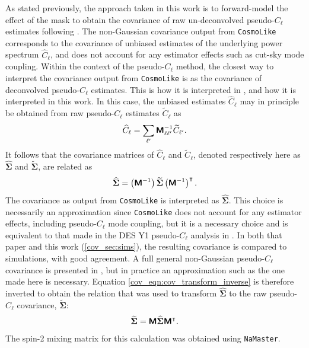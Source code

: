As stated previously, the approach taken in this work is to forward-model the effect of the mask to obtain the covariance of raw un-deconvolved pseudo-$C_\ell$ estimates following \citet{Loureiro2021}.
The non-Gaussian covariance output from \texttt{CosmoLike} corresponds to the covariance of unbiased estimates of the underlying power spectrum $\widehat{C}_\ell$, and does not account for any estimator effects such as cut-sky mode coupling. Within the context of the pseudo-$C_\ell$ method, the closest way to interpret the covariance output from \texttt{CosmoLike} is as the covariance of deconvolved pseudo-$C_\ell$ estimates. This is how it is interpreted in \citet{Camacho2021}, and how it is interpreted in this work. In this case, the unbiased estimates $\widehat{C}_\ell$ may in principle be obtained from raw pseudo-$C_\ell$ estimates $\widetilde{C}_\ell$ as
\begin{equation}
\widehat{C}_\ell = \sum_{\ell'} \bm{\mathsf{M}}^{-1}_{\ell \ell'} \widetilde{C}_{\ell'}.
\end{equation}
It follows that the covariance matrices of $\widehat{C}_\ell$ and $\widetilde{C}_\ell$, denoted respectively here as $\mathbf{\widehat{\Sigma}}$ and $\mathbf{\widetilde{\Sigma}}$, are related as
\begin{equation}
\mathbf{\widehat{\Sigma}} =
\left( \bm{\mathsf{M}}^{-1} \right)
\mathbf{\widetilde{\Sigma}}
\left( \bm{\mathsf{M}}^{-1} \right)^\intercal.
\label{cov_eqn:cov_transform_inverse}
\end{equation}
The covariance as output from \texttt{CosmoLike} is interpreted as $\mathbf{\widehat{\Sigma}}$.
This choice is necessarily an approximation since \texttt{CosmoLike} does not account for any estimator effects, including pseudo-$C_\ell$ mode coupling, but it is a necessary choice and is equivalent to that made in the DES Y1 pseudo-$C_\ell$ analysis in \citet{Camacho2021}. In both that paper and this work (\autoref{cov_sec:sims}), the resulting covariance is compared to simulations, with good agreement. A full general non-Gaussian pseudo-$C_\ell$ covariance is presented in \citet{Shirasaki2015}, but in practice an approximation such as the one made here is necessary.
Equation \eqref{cov_eqn:cov_transform_inverse} is therefore inverted to obtain the relation that was used to transform $\mathbf{\widehat{\Sigma}}$ to the raw pseudo-$C_\ell$ covariance, $\mathbf{\widetilde{\Sigma}}$:
\begin{equation}
\mathbf{\widetilde{\Sigma}} =
\bm{\mathsf{M}} \mathbf{\widehat{\Sigma}} \bm{\mathsf{M}}^\intercal.
\label{cov_eqn:cov_transform}
\end{equation}
The spin-2 mixing matrix  for this calculation was obtained using \texttt{NaMaster}.

